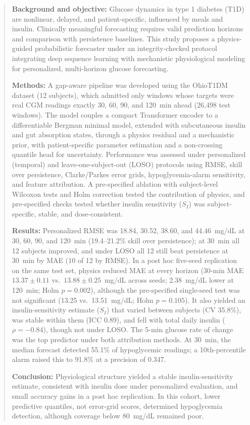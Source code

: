 \documentclass[journal]{IEEEtran}
\begin{document}
\begin{abstract}
\textbf{Background and objective:} Glucose dynamics in type 1 diabetes (T1D) are nonlinear, delayed, and patient-specific, influenced by meals and insulin. Clinically meaningful forecasting requires valid prediction horizons and comparison with persistence baselines. This study proposes a physics-guided probabilistic forecaster under an integrity-checked protocol integrating deep sequence learning with mechanistic physiological modeling for personalized, multi-horizon glucose forecasting.

\textbf{Methods:} A gap-aware pipeline was developed using the OhioT1DM dataset (12 subjects), which admitted only windows whose targets were real CGM readings exactly 30, 60, 90, and 120~min ahead (26,498 test windows). The model couples a compact Transformer encoder to a differentiable Bergman minimal model, extended with subcutaneous insulin and gut absorption states, through a physics residual and a mechanistic prior, with patient-specific parameter estimation and a non-crossing quantile head for uncertainty. Performance was assessed under personalized (temporal) and leave-one-subject-out (LOSO) protocols using RMSE, skill over persistence, Clarke/Parkes error grids, hypoglycemia-alarm sensitivity, and feature attribution. A pre-specified ablation with subject-level Wilcoxon tests and Holm correction tested the contribution of physics, and pre-specified checks tested whether insulin sensitivity ($S_I$) was subject-specific, stable, and dose-consistent.

\textbf{Results:} Personalized RMSE was 18.84, 30.52, 38.60, and 44.46~mg/dL at 30, 60, 90, and 120~min (19.4--21.2\% skill over persistence); at 30~min all 12 subjects improved, and under LOSO all 12 still beat persistence at 30~min by MAE (10 of 12 by RMSE). In a post hoc five-seed replication on the same test set, physics reduced MAE at every horizon (30-min MAE $13.37 \pm 0.11$ vs.\ $13.88 \pm 0.25$~mg/dL across seeds; 2.38~mg/dL lower at 120~min; Holm $p=0.002$), although the pre-specified single-seed test was not significant (13.25 vs.\ 13.51~mg/dL; Holm $p=0.105$). It also yielded an insulin-sensitivity estimate ($S_I$) that varied between subjects (CV 35.8\%), was stable within them (ICC 0.89), and fell with total daily insulin ($\rho=-0.84$), though not under LOSO\@. The 5-min glucose rate of change was the top predictor under both attribution methods. At 30~min, the median forecast detected 55.1\% of hypoglycemic readings; a 10th-percentile alarm raised this to 91.8\% at a precision of 0.347.

\textbf{Conclusion:} Physiological structure yielded a stable insulin-sensitivity estimate, consistent with insulin dose under personalized evaluation, and small accuracy gains in a post hoc replication. In this cohort, lower predictive quantiles, not error-grid scores, determined hypoglycemia detection, although coverage below 80~mg/dL remained poor.
\end{abstract}
\end{document}
